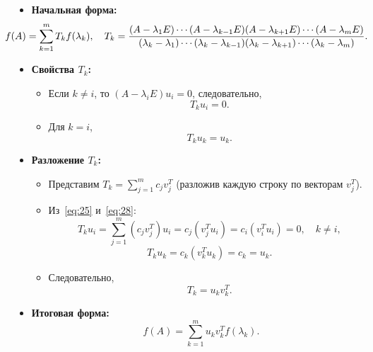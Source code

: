 	\begin{itemize}
		\item \textbf{Начальная форма:}
		\begin{equation}
			\hspace{-3em}f(A) = \sum_{k=1}^m T_k f(\lambda_k), \quad T_k = \frac{(A - \lambda_1 E) \cdots (A - \lambda_{k-1} E)(A - \lambda_{k+1} E) \cdots (A - \lambda_m E)}{(\lambda_k - \lambda_1) \cdots (\lambda_k - \lambda_{k-1})(\lambda_k - \lambda_{k+1}) \cdots (\lambda_k - \lambda_m)}.
		\end{equation}
		\item \textbf{Свойства \(T_k\):}
		\begin{itemize}
			\item Если \(k \neq i\), то \((A - \lambda_i E) u_i = 0\), следовательно,
			\begin{equation}
				T_k u_i = 0. \label{eq:28}
			\end{equation}
			\item Для \(k = i\),
			\begin{equation}
				T_k u_k = u_k.
			\end{equation}
		\end{itemize}
		\item \textbf{Разложение \(T_k\):}
		\begin{itemize}
			\item Представим \(T_k = \sum_{j=1}^m c_j v_j^T\) (разложив каждую строку по векторам \(v_j^T\)).
			\item Из~\eqref{eq:25} и~\eqref{eq:28}:
			\begin{equation}
				T_k u_i = \sum_{j=1}^m (c_j v_j^T)u_i = c_j (v_j^T u_i) = c_i (v_i^T u_i) = 0, \quad k \neq i,
			\end{equation}
			\begin{equation}
				T_k u_k = c_k (v_k^T u_k) = c_k = u_k.
			\end{equation}
			\item Следовательно,
			\begin{equation}
				T_k = u_k v_k^T.
			\end{equation}
		\end{itemize}
		\item \textbf{Итоговая форма:}
		\begin{equation}
			f(A) = \sum_{k=1}^m u_k v_k^T f(\lambda_k).
		\end{equation}
	\end{itemize}
	
	\newpage
	
